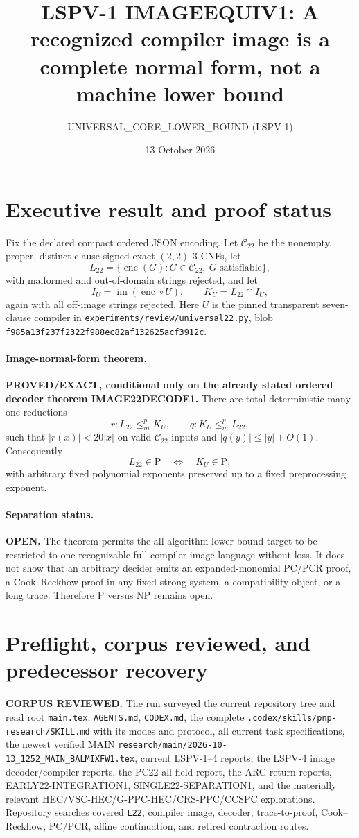 \documentclass[11pt]{article}
\title{LSPV-1 IMAGEEQUIV1: A recognized compiler image is a complete normal form, not a machine lower bound}
\author{UNIVERSAL\_CORE\_LOWER\_BOUND (LSPV-1)}
\date{13 October 2026}
\newcommand{\Ltwo}{L_{22}}
\newcommand{\KU}{K_U}
\newcommand{\status}[1]{\textbf{#1}}
\begin{document}
\sloppy
\maketitle

\section*{Executive result and proof status}
Fix the declared compact ordered JSON encoding.  Let $\mathcal C_{22}$ be the nonempty, proper, distinct-clause signed exact-$(2,2)$ 3-CNFs, let
\[
  \Ltwo=\{\operatorname{enc}(G):G\in\mathcal C_{22},\ G\text{ satisfiable}\},
\]
with malformed and out-of-domain strings rejected, and let
\[
 I_U=\operatorname{im}(\operatorname{enc}\circ U),\qquad
 \KU=\Ltwo\cap I_U,
\]
again with all off-image strings rejected.  Here $U$ is the pinned transparent seven-clause compiler in
\texttt{experiments/review/universal22.py}, blob
\texttt{f985a13f237f2322f988ec82af132625acf3912c}.

\paragraph{Image-normal-form theorem.}
\status{PROVED/EXACT, conditional only on the already stated ordered decoder theorem IMAGE22DECODE1.}
There are total deterministic many-one reductions
\[
  r:\Ltwo\leq_m^p\KU,
  \qquad q:\KU\leq_m^p\Ltwo,
\]
such that $|r(x)|<20|x|$ on valid $\mathcal C_{22}$ inputs and $|q(y)|\leq |y|+O(1)$.
Consequently
\[
             \Ltwo\in\mathrm P\quad\Longleftrightarrow\quad \KU\in\mathrm P,
\]
with arbitrary fixed polynomial exponents preserved up to a fixed preprocessing exponent.

\paragraph{Separation status.}
\status{OPEN.}  The theorem permits the all-algorithm lower-bound target to be restricted to one recognizable full compiler-image language without loss.  It does not show that an arbitrary decider emits an expanded-monomial PC/PCR proof, a Cook--Reckhow proof in any fixed strong system, a compatibility object, or a long trace.  Therefore P versus NP remains open.

\section*{Preflight, corpus reviewed, and predecessor recovery}
\textbf{CORPUS REVIEWED.}  The run surveyed the current repository tree and read root
\texttt{main.tex}, \texttt{AGENTS.md}, \texttt{CODEX.md}, the complete
\texttt{.codex/skills/pnp-research/SKILL.md} with its modes and protocol, all current task specifications, the newest verified MAIN
\texttt{research/main/2026-10-13\_1252\_MAIN\_BALMIXFW1.tex}, current LSPV-1--4 reports, the LSPV-4 image decoder/compiler reports, the PC22 all-field report, the ARC return reports, EARLY22-INTEGRATION1, SINGLE22-SEPARATION1, and the materially relevant HEC/VSC-HEC/G-PPC-HEC/CRS-PPC/CCSPC explorations.  Repository searches covered \texttt{L22}, compiler image, decoder, trace-to-proof, Cook--Reckhow, PC/PCR, affine continuation, and retired contraction routes.
\end{document}
